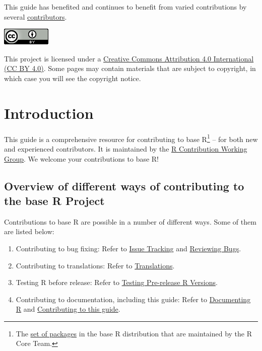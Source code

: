 \documentclass[
]{book}
\providecommand{\tightlist}{%
  \setlength{\itemsep}{0pt}\setlength{\parskip}{0pt}}
\begin{document}
This guide has benefited and continues to benefit from varied contributions by several \href{https://github.com/r-devel/rdevguide\#contributors-}{contributors}.

\href{https://creativecommons.org/licenses/by/4.0/}{\includegraphics{img/ccby.png}}

This project is licensed under a \href{https://creativecommons.org/licenses/by/4.0/}{Creative Commons Attribution 4.0 International (CC BY 4.0)}. Some pages may contain materials that are subject to copyright, in which case you will see the copyright notice.

\chapter{Introduction}\label{introduction}

This guide is a comprehensive resource for contributing to base R\footnote{The \href{https://cran.r-project.org/doc/FAQ/R-FAQ.html\#Add_002don-packages-in-R}{set of packages} in the base R distribution that are maintained by the R Core Team.} -- for both new and experienced contributors. It is maintained by the \href{/working-group}{R Contribution Working Group}. We welcome your contributions to base R!

\section{Overview of different ways of contributing to the base R Project}\label{overview-of-different-ways-of-contributing-to-the-base-r-project}

Contributions to base R are possible in a number of different ways. Some of them are listed below:

\begin{enumerate}
\def\labelenumi{\arabic{enumi}.}
\tightlist
\item
  Contributing to bug fixing: Refer to \hyperref[IssueTrack]{Issue Tracking} and \hyperref[ReviewBugs]{Reviewing Bugs}.
\item
  Contributing to translations: Refer to \hyperref[message-translations]{Translations}.
\item
  Testing R before release: Refer to \hyperref[TestRVer]{Testing Pre-release R Versions}.
\item
  Contributing to documentation, including this guide: Refer to \hyperref[Doc]{Documenting R} and \hyperref[how-to-contribute-to-this-guide]{Contributing to this guide}.
\end{enumerate}
\end{document}
